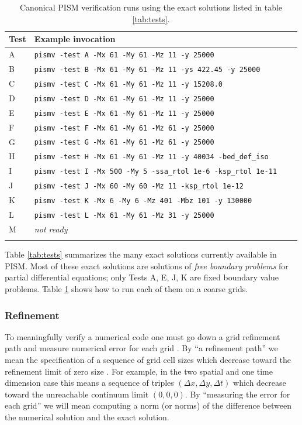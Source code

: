 \documentclass[11pt,final]{amsart}
\begin{document}
\begin{table}[ht]
\caption{Canonical PISM verification runs using the exact solutions listed in table \ref{tab:tests}.}\label{tab:tests_exec}
\small
\begin{tabular}{@{}llll}\hline
\textbf{Test} & \textbf{Example invocation}  \\ \hline
A & \verb|pismv -test A -Mx 61 -My 61 -Mz 11 -y 25000| \\
B & \verb|pismv -test B -Mx 61 -My 61 -Mz 11 -ys 422.45 -y 25000|  \\
C & \verb|pismv -test C -Mx 61 -My 61 -Mz 11 -y 15208.0|  \\
D & \verb|pismv -test D -Mx 61 -My 61 -Mz 11 -y 25000|  \\
E & \verb|pismv -test E -Mx 61 -My 61 -Mz 11 -y 25000|  \\
F & \verb|pismv -test F -Mx 61 -My 61 -Mz 61 -y 25000|  \\
G & \verb|pismv -test G -Mx 61 -My 61 -Mz 61 -y 25000|  \\
H & \verb|pismv -test H -Mx 61 -My 61 -Mz 11 -y 40034 -bed_def_iso| \\
I & \verb|pismv -test I -Mx 500 -My 5 -ssa_rtol 1e-6 -ksp_rtol 1e-11| \\
J & \verb|pismv -test J -Mx 60 -My 60 -Mz 11 -ksp_rtol 1e-12| \\
K & \verb|pismv -test K -Mx 6 -My 6 -Mz 401 -Mbz 101 -y 130000| \\
L & \verb|pismv -test L -Mx 61 -My 61 -Mz 31 -y 25000| \\
M & \emph{not ready} \\
\hline
\normalsize
\end{tabular}
\end{table}

Table \ref{tab:tests} summarizes the many exact solutions currently available in PISM.  Most of these exact solutions are solutions of \emph{free boundary problems} for partial differential equations; only Tests A, E, J, K are fixed boundary value problems.  Table \ref{tab:tests_exec} shows how to run each of them on a coarse grids.

\subsubsection*{Refinement}  To meaningfully verify a numerical code one must go down a grid refinement path and measure numerical error for each grid \cite{Roache}.  By ``a refinement path'' we mean the specification of a sequence of grid cell sizes which decrease toward the refinement limit of zero size \cite{MortonMayers}.  For example, in the two spatial and one time dimension case this means a sequence of triples $(\Delta x,\Delta y,\Delta t)$ which decrease toward the unreachable continuum limit $(0,0,0)$.  By ``measuring the error for each grid'' we will mean computing a norm (or norms) of the difference between the numerical solution and the exact solution.
\end{document}
